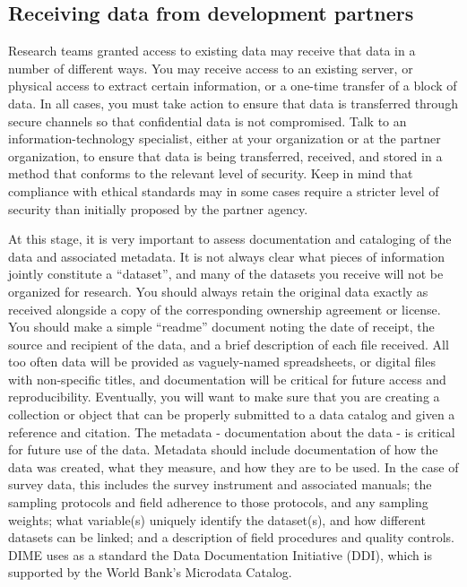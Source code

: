 \subsection{Receiving data from development partners}

Research teams granted access to existing data may receive that data in a number of different ways.
You may receive access to an existing server, 
or physical access to extract certain information, 
or a one-time transfer of a block of data.
In all cases, you must take action to ensure that data is transferred through 
secure channels so that confidential data is not compromised.
Talk to an information-technology specialist,
either at your organization or at the partner organization,
to ensure that data is being transferred, received, and stored
in a method that conforms to the relevant level of security.
Keep in mind that compliance with ethical standards may 
in some cases require a stricter level of security than initially proposed by the partner agency.

At this stage, it is very important to assess
documentation and cataloging of the data and associated metadata.
It is not always clear what pieces of information jointly constitute a ``dataset'',
and many of the datasets you receive will not be organized for research.
You should always retain the original data exactly as received
alongside a copy of the corresponding ownership agreement or license.
You should make a simple ``readme'' document noting the date of receipt,
the source and recipient of the data, 
and a brief description of each file received.
All too often data will be provided as vaguely-named spreadsheets,
or digital files with non-specific titles, 
and documentation will be critical for future access and reproducibility.
Eventually, you will want to make sure that you are creating a collection or object
that can be properly submitted to a data catalog and given a reference and citation.
The metadata - documentation about the data - is critical for future use of the data.
Metadata should include documentation of how the data was created, 
what they measure, and how they are to be used.
In the case of survey data, this includes the survey instrument and associated manuals; 
the sampling protocols and field adherence to those protocols, and any sampling weights;
what variable(s) uniquely identify the dataset(s), and how different datasets can be linked;
and a description of field procedures and quality controls. 
DIME uses as a standard the Data Documentation Initiative (DDI), which is supported by the 
World Bank's Microdata Catalog.

